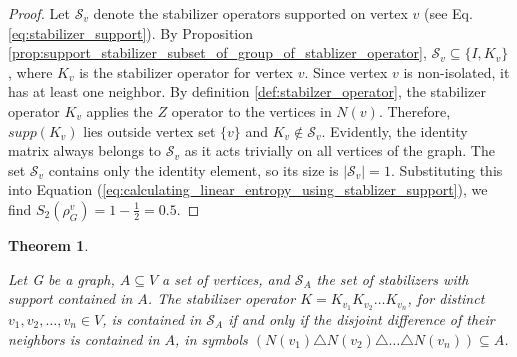 \documentclass{article}
\newtheorem{theorem}{Theorem}
\begin{document}
\begin{proof}
    
    Let \( \mathcal{S}_v \) denote the stabilizer operators supported on vertex \( v \) (see Eq. \eqref{eq:stabilizer_support}). By Proposition \ref{prop:support_stabilizer_subset_of_group_of_stablizer_operator}, \( \mathcal{S}_v \subseteq \{I, K_v\} \), where \( K_v \) is the stabilizer operator for vertex \( v \). Since vertex $v$ is non-isolated, it has at least one neighbor. By definition \ref{def:stabilzer_operator}, the stabilizer operator \( K_v \) applies the \( Z \) operator to the vertices in \( N(v) \). Therefore, $supp(K_v)$ lies outside vertex set $\{v\}$ and $K_v \not \in \mathcal{S}_v$. Evidently, the identity matrix always belongs to $\mathcal{S}_v$ as it acts trivially on all vertices of the graph. The set \(\mathcal{S}_v\) contains only the identity element, so its size is \(|\mathcal{S}_v| = 1\). Substituting this into Equation (\ref{eq:calculating_linear_entropy_using_stablizer_support}), we find \(S_2(\rho^v_G) = 1 - \frac{1}{2} = 0.5\).
\end{proof}

\begin{theorem}
\label{theorem:stabilizer_operator_supported_iff_symmetric_difference}    

    Let G be a graph, $A \subseteq V$ a set of vertices, and $\mathcal{S}_A$ the set of stabilizers with support contained in $A$. The stabilizer operator $K = K_{v_1}K_{v_2} \dots K_{v_n}$, for distinct $v_1, v_2, \ldots, v_n \in V$, is contained in $\mathcal{S}_A$ if and only if the disjoint difference of their neighbors is contained in $A$, in symbols $(N(v_1) \triangle N(v_2) \triangle \dots \triangle N(v_n)) \subseteq A$.
\end{theorem}
\end{document}
